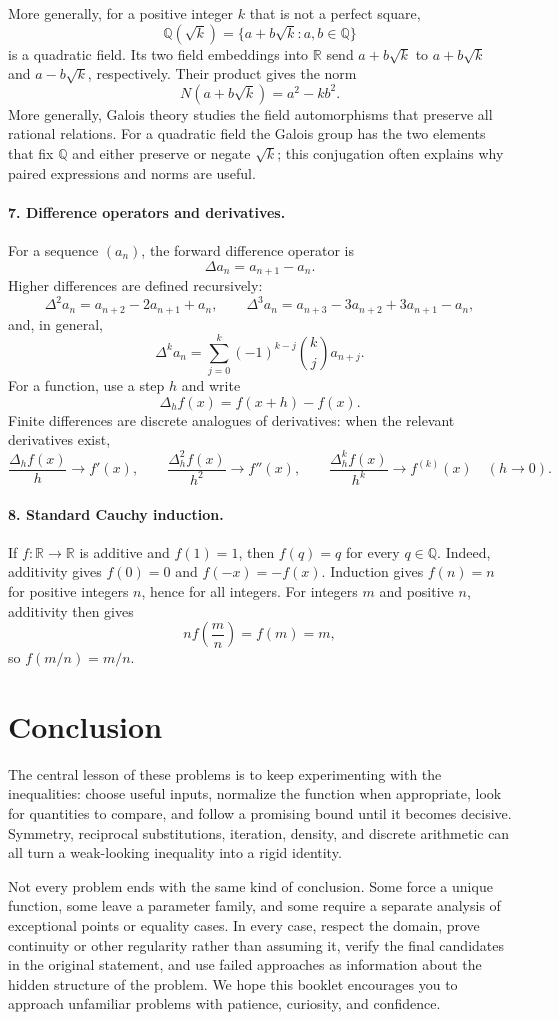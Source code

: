 \documentclass[12pt,a4paper]{article}
\begin{document}
More generally, for a positive integer $k$ that is not a perfect square,
\[
\mathbb Q(\sqrt{k})=\{a+b\sqrt{k}:a,b\in\mathbb Q\}
\]
is a quadratic field. Its two field embeddings into $\mathbb R$ send
$a+b\sqrt{k}$ to $a+b\sqrt{k}$ and $a-b\sqrt{k}$, respectively. Their
product gives the norm
\[
N(a+b\sqrt{k})=a^2-kb^2.
\]
More generally, Galois theory studies the field automorphisms that preserve
all rational relations. For a quadratic field the Galois group has the two
elements that fix $\mathbb Q$ and either preserve or negate $\sqrt{k}$; this
conjugation often explains why paired expressions and norms are useful.

\paragraph{7. Difference operators and derivatives.}
For a sequence $(a_n)$, the forward difference operator is
\[
\Delta a_n=a_{n+1}-a_n.
\]
Higher differences are defined recursively:
\[
\Delta^2a_n=a_{n+2}-2a_{n+1}+a_n,\qquad
\Delta^3a_n=a_{n+3}-3a_{n+2}+3a_{n+1}-a_n,
\]
and, in general,
\[
\Delta^k a_n=\sum_{j=0}^k(-1)^{k-j}\binom{k}{j}a_{n+j}.
\]
For a function, use a step $h$ and write
\[
\Delta_h f(x)=f(x+h)-f(x).
\]
Finite differences are discrete analogues of derivatives: when the relevant
derivatives exist,
\[
\frac{\Delta_h f(x)}{h}\to f'(x),\qquad
\frac{\Delta_h^2 f(x)}{h^2}\to f''(x),\qquad
\frac{\Delta_h^k f(x)}{h^k}\to f^{(k)}(x)
\quad(h\to0).
\]

\paragraph{8. Standard Cauchy induction.}
If $f:\mathbb R\to\mathbb R$ is additive and $f(1)=1$, then $f(q)=q$ for
every $q\in\mathbb Q$. Indeed, additivity gives $f(0)=0$ and $f(-x)=-f(x)$.
Induction gives $f(n)=n$ for positive integers $n$, hence for all integers.
For integers $m$ and positive $n$, additivity then gives
\[
n f\left(\frac{m}{n}\right)=f(m)=m,
\]
so $f(m/n)=m/n$.

\newpage
\section*{Conclusion}

The central lesson of these problems is to keep experimenting with the
inequalities: choose useful inputs, normalize the function when appropriate,
look for quantities to compare, and follow a promising bound until it becomes
decisive. Symmetry, reciprocal substitutions, iteration, density, and
discrete arithmetic can all turn a weak-looking inequality into a rigid
identity.

Not every problem ends with the same kind of conclusion. Some force a unique
function, some leave a parameter family, and some require a separate analysis
of exceptional points or equality cases. In every case, respect the domain,
prove continuity or other regularity rather than assuming it, verify the final
candidates in the original statement, and use failed approaches as information
about the hidden structure of the problem. We hope this booklet encourages you
to approach unfamiliar problems with patience, curiosity, and confidence.
\end{document}
